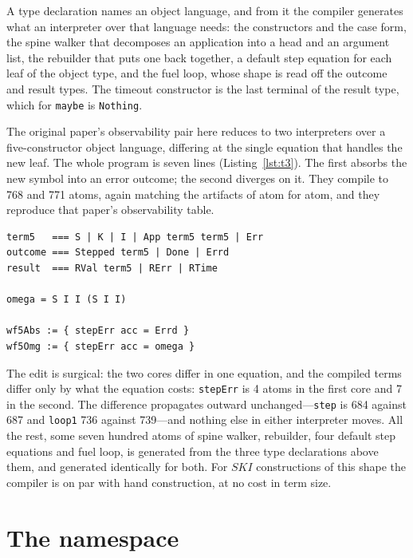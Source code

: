 \documentclass[english,submission,code=tt]{programming}
\begin{document}
A type declaration names an object language, and from it the compiler
generates what an interpreter over that language needs: the
constructors and the case form, the spine walker that decomposes an
application into a head and an argument list, the rebuilder that puts
one back together, a default step equation for each leaf of the object 
type, and the fuel loop, whose shape is read off the outcome and result types. The timeout constructor is the last terminal of the result type,
which for \texttt{maybe} is \texttt{Nothing}.

The original paper's observability pair here reduces to two interpreters
over a five-constructor object language, differing at the single
equation that handles the new leaf.  The whole program is seven lines
(Listing~\ref{lst:t3}).
The first absorbs the new symbol into an error outcome; the
second diverges on it.  They compile to 768 and 771 atoms, again
matching the artifacts of \citet{Davis2027} atom for atom, and they
reproduce that paper's observability table.

\begin{lstlisting}[label=lst:t3,float=tb,
                   caption={Two interpreters over a five-constructor
                   object language, differing in one equation.}]
term5   === S | K | I | App term5 term5 | Err
outcome === Stepped term5 | Done | Errd
result  === RVal term5 | RErr | RTime

omega = S I I (S I I)

wf5Abs := { stepErr acc = Errd }
wf5Omg := { stepErr acc = omega }
\end{lstlisting}

The edit is surgical:  the two cores differ in one equation, and the 
compiled terms differ only by what the equation costs: \texttt{stepErr} 
is 4 atoms in the first core and 7 in the second.  The difference
propagates outward unchanged---\texttt{step} is 684 against 687 and
\texttt{loop1} 736 against 739---and nothing else in either
interpreter moves.  All the rest, some seven hundred atoms of spine
walker, rebuilder, four default step equations and fuel loop, is
generated from the three type declarations above them, and generated
identically for both.  For $SKI$ constructions of this shape the
compiler is on par with hand construction, at no cost in term size.

\section{The namespace}\label{sec:namespace}
\end{document}

